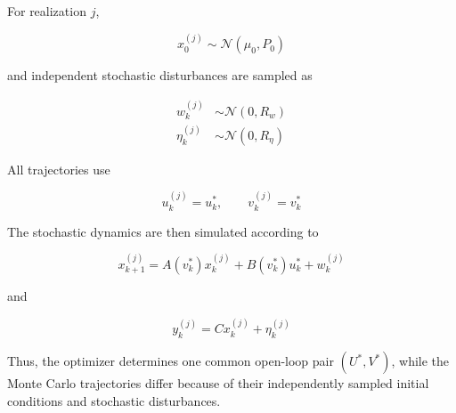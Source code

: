 For realization \(j\),

\begin{equation}
    x_0^{(j)}
    \sim
    \mathcal{N}(\mu_0,P_0)
\end{equation}

and independent stochastic disturbances are sampled as

\begin{align}
    w_k^{(j)}
    &\sim
    \mathcal{N}(0,R_w)\\
    \eta_k^{(j)}
    &\sim
    \mathcal{N}(0,R_\eta)
\end{align}

All trajectories use

\begin{equation}
    u_k^{(j)}=u_k^\ast,
    \qquad
    v_k^{(j)}=v_k^\ast
\end{equation}

The stochastic dynamics are then simulated according to

\begin{equation}
    x_{k+1}^{(j)}
    =
    A(v_k^\ast)x_k^{(j)}
    +
    B(v_k^\ast)u_k^\ast
    +
    w_k^{(j)}
\end{equation}

and

\begin{equation}
    y_k^{(j)}
    =
    Cx_k^{(j)}
    +
    \eta_k^{(j)}
\end{equation}

Thus, the optimizer determines one common open-loop pair
\((U^\ast,V^\ast)\), while the Monte Carlo trajectories differ because of
their independently sampled initial conditions and stochastic disturbances.

